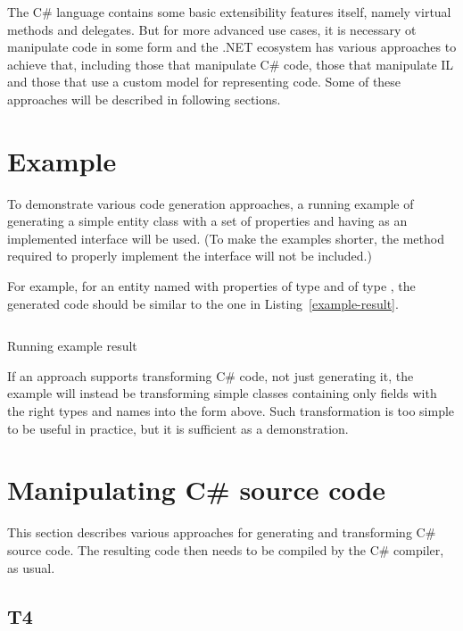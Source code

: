 \medskip

The C\# language contains some basic extensibility features itself, namely virtual methods and delegates.
But for more advanced use cases, it is necessary ot manipulate code in some form and the .NET ecosystem has various approaches to achieve that, including those that manipulate C\# code, those that manipulate \ac{IL} and those that use a custom model for representing code. Some of these approaches will be described in following sections.

\section{Example}

To demonstrate various code generation approaches, a running example of generating a simple entity class with a set of properties and having  as an implemented interface will be used. (To make the examples shorter, the  method required to properly implement the interface will not be included.)

For example, for an entity named  with properties  of type  and  of type , the generated code should be similar to the one in Listing~\ref{example-result}.

\begin{listing}
\inputminted{csharp}{samples/Core/Person.cs}
\caption{Running example result}
\label{example-result}
\end{listing}

If an approach supports transforming C\# code, not just generating it, the example will instead be transforming simple classes containing only fields with the right types and names into the form above. Such transformation is too simple to be useful in practice, but it is sufficient as a demonstration.

\section{Manipulating C\# source code}

This section describes various approaches for generating and transforming C\# source code. The resulting code then needs to be compiled by the C\# compiler, as usual.

\subsection{\acs{T4}}

